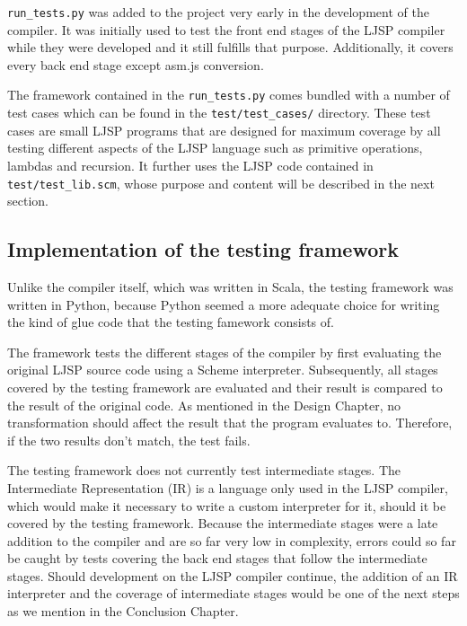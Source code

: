 \documentclass[11pt]{report}
\begin{document}
\texttt{run_tests.py} was added to the project very early in the development of the compiler. It was initially used to test the front end stages of the LJSP compiler while they were developed and it still fulfills that purpose. Additionally, it covers every back end stage except asm.js conversion.

The framework contained in the \texttt{run_tests.py} comes bundled with a number of test cases which can be found in the \texttt{test/test_cases/} directory. These test cases are small LJSP programs that are designed for maximum coverage by all testing different aspects of the LJSP language such as primitive operations, lambdas and recursion. It further uses the LJSP code contained in \texttt{test/test_lib.scm}, whose purpose and content will be described in the next section.

\subsection{Implementation of the testing framework}
Unlike the compiler itself, which was written in Scala, the testing framework was written in Python, because Python seemed a more adequate choice for writing the kind of glue code that the testing famework consists of. 

The framework tests the different stages of the compiler by first evaluating the original LJSP source code using a Scheme interpreter. Subsequently, all stages covered by the testing framework are evaluated and their result is compared to the result of the original code. As mentioned in the Design Chapter, no transformation should affect the result that the program evaluates to. Therefore, if the two results don't match, the test fails.

The testing framework does not currently test intermediate stages. The Intermediate Representation (IR) is a language only used in the LJSP compiler, which would make it necessary to write a custom interpreter for it, should it be covered by the testing framework. Because the intermediate stages were a late addition to the compiler and are so far very low in complexity, errors could so far be caught by tests covering the back end stages that follow the intermediate stages. Should development on the LJSP compiler continue, the addition of an IR interpreter and the coverage of intermediate stages would be one of the next steps as we mention in the Conclusion Chapter.
\end{document}
